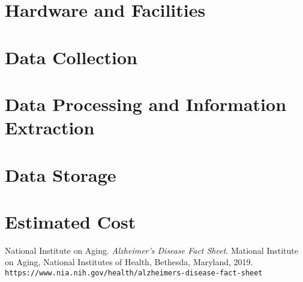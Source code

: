 \documentclass{article}
\begin{document}
\section{Hardware and Facilities}
\section{Data Collection}
\section{Data Processing and Information Extraction}
\section{Data Storage}
\section{Estimated Cost}



\begin{thebibliography}{9}

National Institute on Aging. 
\textit{Alzheimer's Disease Fact Sheet}. 
Mational Institute on Aging, National Institutes of Health, Bethesda, Maryland, 2019.
\\\texttt{https://www.nia.nih.gov/health/alzheimers-disease-fact-sheet}

\end{thebibliography}
\end{document}
